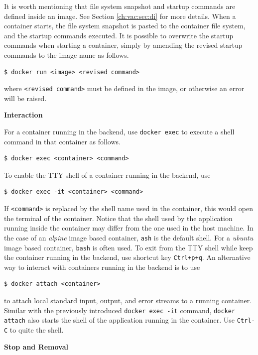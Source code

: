 It is worth mentioning that file system snapshot and startup commands are defined inside an image. See Section \ref{ch:vac:sec:di} for more details. When a container starts, the file system snapshot is pasted to the container file system, and the startup commands executed. It is possible to overwrite the startup commands when starting a container, simply by amending the revised startup commands to the image name as follows.
\begin{lstlisting}
$ docker run <image> <revised command>
\end{lstlisting}
where \verb|<revised command>| must be defined in the image, or otherwise an error will be raised.

\vspace{0.1in}
\noindent \textbf{Interaction}
\vspace{0.1in}

For a container running in the backend, use \verb|docker exec| to execute a shell command in that container as follows.
\begin{lstlisting}
$ docker exec <container> <command>
\end{lstlisting}
To enable the TTY shell of a container running in the backend, use
\begin{lstlisting}
$ docker exec -it <container> <command>
\end{lstlisting}
If \verb|<command>| is replaced by the shell name used in the container, this would open the terminal of the container. Notice that the shell used by the application running inside the container may differ from the one used in the host machine. In the case of an \textit{alpine} image based container, \verb|ash| is the default shell. For a \textit{ubuntu} image based container, \verb|bash| is often used. To exit from the TTY shell while keep the container running in the backend, use shortcut key \verb|Ctrl+p+q|. An alternative way to interact with containers running in the backend is to use
\begin{lstlisting}
$ docker attach <container>
\end{lstlisting}
to attach local standard input, output, and error streams to a running container. Similar with the previously introduced \texttt{docker exec -it} command, \texttt{docker attach} also starts the shell of the application running in the container. Use \verb|Ctrl-C| to quite the shell.

\vspace{0.1in}
\noindent \textbf{Stop and Removal}
\vspace{0.1in}

